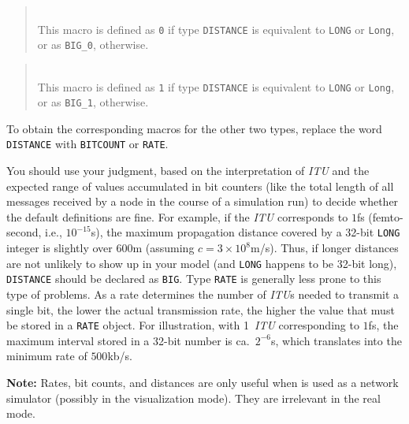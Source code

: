 \begin{quote}
\noindent{}\\ \hspace{0in}
This macro is defined as {\tt 0} if type {\tt DISTANCE} is equivalent to
{\tt LONG} or {\tt Long}, or as {\tt BIG\_0}, otherwise.
\end{quote}

\begin{quote}
\noindent{}\\ \hspace{0in}
This macro is defined as {\tt 1} if type {\tt DISTANCE} is equivalent to
{\tt LONG} or {\tt Long}, or as {\tt BIG\_1}, otherwise.
\end{quote}\medskip

To obtain the corresponding macros for the other two types, replace
the word {\tt DISTANCE} with {\tt BITCOUNT} or {\tt RATE}.

You should use your judgment, based on the interpretation of {\em ITU\/} and the
expected range of values accumulated in bit counters (like the total length
of all messages received by a node in the course of a simulation run) to 
decide whether the default definitions are fine.
For example, if the {\em ITU\/} corresponds to $1$fs (femto-second, i.e.,
$10^{-15}$s), the
maximum propagation distance covered by a 32-bit {\tt LONG} integer is
slightly over $600$m (assuming $c = 3 \times 10^8$m/s).
Thus, if longer distances are not unlikely to show up in your model (and
{\tt LONG} happens to be 32-bit long), {\tt DISTANCE} should be declared
as {\tt BIG}.
Type {\tt RATE} is generally less prone to this type of problems.
As a rate determines the number of {\em ITU\/}s needed to transmit a single
bit, the lower the actual transmission rate, the higher the value that must
be stored in a {\tt RATE} object.
For illustration,
with 1~{\em ITU\/} corresponding to $1$fs, the maximum interval stored
in a 32-bit number is ca.\ $2^{-6}$s, which translates into the minimum
rate of $500$kb/s.

\medskip

\noindent
{\bf Note:} Rates, bit counts, and distances are only useful when {\smurph}
is used as a network simulator (possibly in the visualization mode).
They are irrelevant in the real mode.

\medskip

